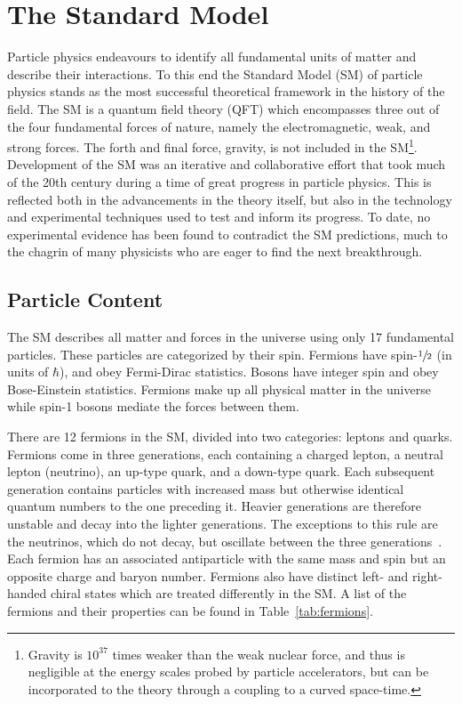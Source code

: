 \chapter{The Standard Model}
\label{chap:sm}

Particle physics endeavours to identify all fundamental units of matter and describe their interactions.
To this end the Standard Model (SM) of particle physics stands as the most successful theoretical framework in the history of the field.
The SM is a quantum field theory (QFT) which encompasses three out of the four fundamental forces of nature, namely the electromagnetic, weak, and strong forces.
The forth and final force, gravity, is not included in the SM\footnote{Gravity is $10^{37}$ times weaker than the weak nuclear force, and thus is negligible at the energy scales probed by particle accelerators, but can be incorporated to the theory through a coupling to a curved space-time.}.
Development of the SM was an iterative and collaborative effort that took much of the 20th century during a time of great progress in particle physics.
This is reflected both in the advancements in the theory itself, but also in the technology and experimental techniques used to test and inform its progress.
To date, no experimental evidence has been found to contradict the SM predictions, much to the chagrin of many physicists who are eager to find the next breakthrough.

\section{Particle Content}

The SM describes all matter and forces in the universe using only 17 fundamental particles.
These particles are categorized by their spin.
Fermions have spin-$\sfrac{1}{2}$ (in units of $\hbar$), and obey Fermi-Dirac statistics.
Bosons have integer spin and obey Bose-Einstein statistics.
Fermions make up all physical matter in the universe while spin-1 bosons mediate the forces between them.

There are 12 fermions in the SM, divided into two categories: leptons and quarks.
Fermions come in three generations, each containing a charged lepton, a neutral lepton (neutrino), an up-type quark, and a down-type quark.
Each subsequent generation contains particles with increased mass but otherwise identical quantum numbers to the one preceding it.
Heavier generations are therefore unstable and decay into the lighter generations.
The exceptions to this rule are the neutrinos, which do not decay, but oscillate between the three generations~\cite{NeutrinoOsc}.
Each fermion has an associated antiparticle with the same mass and spin but an opposite charge and baryon number.
Fermions also have distinct left- and right-handed chiral states which are treated differently in the SM\@.
A list of the fermions and their properties can be found in Table~\ref{tab:fermions}.


